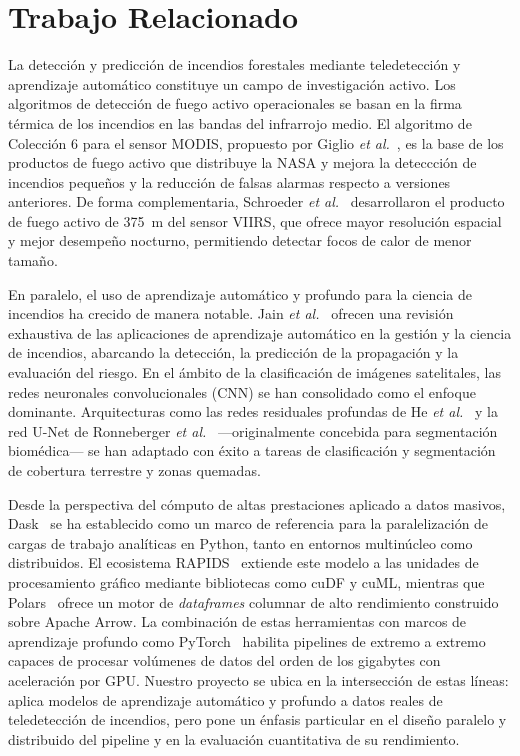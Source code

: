 \section{Trabajo Relacionado}
\label{sec:related}

La detección y predicción de incendios forestales mediante teledetección y aprendizaje automático constituye un campo de investigación activo. Los algoritmos de detección de fuego activo operacionales se basan en la firma térmica de los incendios en las bandas del infrarrojo medio. El algoritmo de Colección 6 para el sensor MODIS, propuesto por Giglio \textit{et al.}~\cite{giglio2016}, es la base de los productos de fuego activo que distribuye la NASA y mejora la deteccción de incendios pequeños y la reducción de falsas alarmas respecto a versiones anteriores. De forma complementaria, Schroeder \textit{et al.}~\cite{schroeder2014} desarrollaron el producto de fuego activo de 375~m del sensor VIIRS, que ofrece mayor resolución espacial y mejor desempeño nocturno, permitiendo detectar focos de calor de menor tamaño.

En paralelo, el uso de aprendizaje automático y profundo para la ciencia de incendios ha crecido de manera notable. Jain \textit{et al.}~\cite{jain2020} ofrecen una revisión exhaustiva de las aplicaciones de aprendizaje automático en la gestión y la ciencia de incendios, abarcando la detección, la predicción de la propagación y la evaluación del riesgo. En el ámbito de la clasificación de imágenes satelitales, las redes neuronales convolucionales (CNN) se han consolidado como el enfoque dominante. Arquitecturas como las redes residuales profundas de He \textit{et al.}~\cite{he2016} y la red U-Net de Ronneberger \textit{et al.}~\cite{ronneberger2015} —originalmente concebida para segmentación biomédica— se han adaptado con éxito a tareas de clasificación y segmentación de cobertura terrestre y zonas quemadas.

Desde la perspectiva del cómputo de altas prestaciones aplicado a datos masivos, Dask~\cite{rocklin2015} se ha establecido como un marco de referencia para la paralelización de cargas de trabajo analíticas en Python, tanto en entornos multinúcleo como distribuidos. El ecosistema RAPIDS~\cite{rapids} extiende este modelo a las unidades de procesamiento gráfico mediante bibliotecas como cuDF y cuML, mientras que Polars~\cite{polars} ofrece un motor de \textit{dataframes} columnar de alto rendimiento construido sobre Apache Arrow. La combinación de estas herramientas con marcos de aprendizaje profundo como PyTorch~\cite{paszke2019} habilita pipelines de extremo a extremo capaces de procesar volúmenes de datos del orden de los gigabytes con aceleración por GPU. Nuestro proyecto se ubica en la intersección de estas líneas: aplica modelos de aprendizaje automático y profundo a datos reales de teledetección de incendios, pero pone un énfasis particular en el diseño paralelo y distribuido del pipeline y en la evaluación cuantitativa de su rendimiento.

